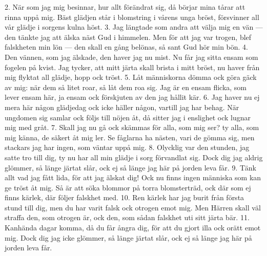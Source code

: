 2.  När som jag mig besinnar, hur allt förändrat sig,
    då börjar mina tårar att rinna uppå mig.
    Bäst glädjen står i blomstring i vårens unga bröst,
    försvinner all vår glädje i sorgens kulna höst.
3.  Jag längtade som andra att välja mig en vän —
    den tänkte jag att älska näst Gud i himmelen.
    Men för att jag var trogen, blef falskheten min lön —
    den skall en gång belönas, så sant Gud hör min bön.
4.  Den vännen, som jag älskade, den haver jag nu mist.
    Nu får jag sitta ensam som fogelen på kvist.
    Jag tycker, att mitt järta skall brista i mitt bröst,
    nu haver från mig flyktat all glädje, hopp ock tröst.
5.  Låt människorna dömma ock göra gäck av mig:
    när dem så litet roar, så låt dem roa sig.
    Jag är en ensam flicka, som lever ensam här,
    ja ensam ock förskjuten av den jag hållit kär.
6.  Jag haver nu ej mera här någon glädjedag
    ock icke häller någon, vartill jag har behag.
    När ungdomen sig samlar ock följs till nöjen åt,
    då sitter jag i enslighet ock lugnar mig med gråt.
7.  Skall jag nu gå ock skämmas för alla, som mig ser?
    ty alla, som mig känna, de säkert åt mig ler.
    Se fåglarna ha nästen, vari de gömma sig,
    men stackars jag har ingen, som väntar uppå mig.
8.  Olycklig var den stunden, jag satte tro till dig,
    ty nu har all min glädje i sorg förvandlat sig.
    Dock dig jag aldrig glömmer, så länge järtat slår,
    ock ej så länge jag här på jorden leva får.
9.  Tänk allt vad jag fått lida, för att jag älskat dig!
    Ock nu finns ingen människa som kan ge tröst åt mig.
    Så är att söka blommor på torra blomsterträd,
    ock där som ej finns kärlek, där följer falskhet med.
10. Ren kärlek har jag burit från första stund till dig,
    men du har varit falsk ock otrogen emot mig.
    Men Härren skall väl straffa den, som otrogen är,
    ock den, som sådan falskhet uti sitt järta bär.
11. Kanhända dagar komma, då du får ångra dig,
    för att du gjort illa ock orätt emot mig.
    Dock dig jag icke glömmer, så länge järtat slår,
    ock ej så länge jag här på jorden leva får.
